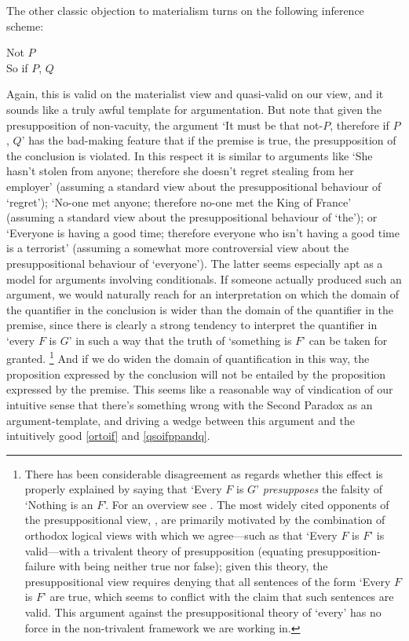 \documentclass[If.tex]{subfiles}
\begin{document}
The other classic objection to materialism turns on the following inference scheme:
\begin{prop}
	\parbox[t]{\linewidth}{Not $P$\\
	So if $P$, $Q$}
\end{prop}
Again, this is valid on the materialist view and quasi-valid on our view, and it sounds like a truly awful template for argumentation. But note that given the presupposition of non-vacuity, the argument ‘It must be that not-$P$, therefore if $P$, $Q$’ has the bad-making feature that if the premise is true, the presupposition of the conclusion is violated. In this respect it is similar to arguments like ‘She hasn't stolen from anyone; therefore she doesn't regret stealing from her employer’ (assuming a standard view about the presuppositional behaviour of ‘regret’); ‘No-one met anyone; therefore no-one met the King of France’ (assuming a standard view about the presuppositional behaviour of ‘the’); or ‘Everyone is having a good time; therefore everyone who isn't having a good time is a terrorist’ (assuming a somewhat more controversial view about the presuppositional behaviour of ‘everyone’). The latter seems especially apt as a model for arguments involving conditionals.  If someone actually produced such an argument, we would naturally reach for an interpretation on which the domain of the quantifier in the conclusion is wider than the domain of the quantifier in the premise, since there is clearly a strong tendency to interpret the quantifier in ‘every $F$ is $G$’ in such a way that the truth of ‘something is $F$’ can be taken for granted.%
\footnote{There has been considerable disagreement as regards whether this effect is properly explained by saying that ‘Every $F$ is $G$’ \emph{presupposes} the falsity of ‘Nothing is an $F$’.  For an overview see \cite[§6.8.2]{HeimKratzerSGG}.  The most widely cited opponents of the presuppositional view, \citet{LappinReinhartPESD}, are primarily motivated by the combination of orthodox logical views with which we agree---such as that ‘Every $F$ is $F$’ is valid---with a trivalent theory of presupposition (equating presupposition-failure with being neither true nor false); given this theory, the presuppositional view requires denying that all sentences of the form ‘Every $F$ is $F$’ are true, which seems to conflict with the claim that such sentences are valid.  This argument against the presuppositional theory of ‘every’ has no force in the non-trivalent framework we are working in.}
And if we do widen the domain of quantification in this way, the proposition expressed by the conclusion will not be entailed by the proposition expressed by the premise.  This seems like a reasonable way of vindication of our intuitive sense that there's something wrong with the Second Paradox as an argument-template, and driving a wedge between this argument and the intuitively good \ref{ortoif} and \ref{qsoifppandq}.%
\end{document}
